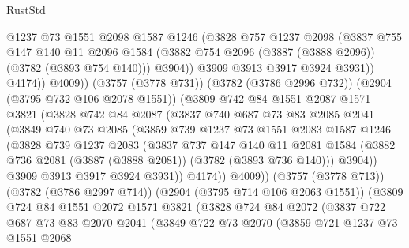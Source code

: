 \begin{lexlean}{RustStd}
\begin{coremodule}
                    @1237
                    @73
                    @1551
                    @2098
                    @1587
                    @1246
                    (@3828
                      @757
                      @1237
                      @2098
                      (@3837
                        @755
                        @147
                        @140
                        @11
                        @2096
                        @1584
                        (@3882 @754 @2096 (@3887 (@3888 @2096)) (@3782 (@3893 @754 @140)))
                        @3904))
                    @3909
                    @3913
                    @3917
                    @3924
                    @3931))
                @4174))
            @4009))
        (@3757 (@3778 @731))
        (@3782 (@3786 @2996 @732))
        (@2904 (@3795 @732 @106 @2078 @1551))
        (@3809
          @742
          @84
          @1551
          @2087
          @1571
          @3821
          (@3828
            @742
            @84
            @2087
            (@3837
              @740
              @687
              @73
              @83
              @2085
              @2041
              (@3849
                @740
                @73
                @2085
                (@3859
                  @739
                  @1237
                  @73
                  @1551
                  @2083
                  @1587
                  @1246
                  (@3828
                    @739
                    @1237
                    @2083
                    (@3837
                      @737
                      @147
                      @140
                      @11
                      @2081
                      @1584
                      (@3882 @736 @2081 (@3887 (@3888 @2081)) (@3782 (@3893 @736 @140)))
                      @3904))
                  @3909
                  @3913
                  @3917
                  @3924
                  @3931))
              @4174))
          @4009))
      (@3757 (@3778 @713))
      (@3782 (@3786 @2997 @714))
      (@2904 (@3795 @714 @106 @2063 @1551))
      (@3809
        @724
        @84
        @1551
        @2072
        @1571
        @3821
        (@3828
          @724
          @84
          @2072
          (@3837
            @722
            @687
            @73
            @83
            @2070
            @2041
            (@3849
              @722
              @73
              @2070
              (@3859
                @721
                @1237
                @73
                @1551
                @2068

\end{coremodule}
\end{lexlean}
